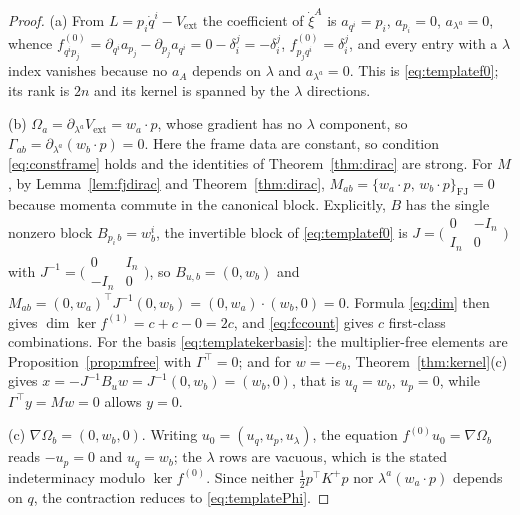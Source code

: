 \documentclass[12pt]{article}
\theoremstyle{plain}
\theoremstyle{definition}
\theoremstyle{remark}
\newcommand{\pd}[1]{\partial_{#1}}
\newcommand{\Om}{\Omega}
\newcommand{\FJ}{\mathrm{FJ}}
\begin{document}
	\begin{proof}
		(a) From $L=p_{i}\dot q^{i}-V_{\mathrm{ext}}$ the coefficient of $\dot\xi^{A}$
		is $a_{q^{i}}=p_{i}$, $a_{p_{i}}=0$, $a_{\lambda^{a}}=0$, whence
		$f^{(0)}_{q^{i}p_{j}}=\pd{q^{i}}a_{p_{j}}-\pd{p_{j}}a_{q^{i}}
		=0-\delta_{i}^{j}=-\delta_{i}^{j}$,
		$f^{(0)}_{p_{j}q^{i}}=\delta_{i}^{j}$, and every entry with a $\lambda$ index
		vanishes because no $a_{A}$ depends on $\lambda$ and $a_{\lambda^{a}}=0$.
		This is \eqref{eq:templatef0}; its rank is $2n$ and its kernel is spanned by
		the $\lambda$ directions.
		
		(b) $\Om_{a}=\partial_{\lambda^{a}}V_{\mathrm{ext}}=w_{a}\!\cdot\!p$, whose
		gradient has no $\lambda$ component, so $\Gamma_{ab}=\partial_{\lambda^{a}}
		(w_{b}\!\cdot\!p)=0$. Here the frame data are constant, so condition
		\eqref{eq:constframe} holds and the identities of Theorem~\ref{thm:dirac} are
		strong. For $M$, by Lemma~\ref{lem:fjdirac} and Theorem~\ref{thm:dirac},
		$M_{ab}=\{w_{a}\!\cdot\!p,\,w_{b}\!\cdot\!p\}_{\FJ}=0$ because momenta commute
		in the canonical block. Explicitly, $B$ has the single nonzero block
		$B_{p_{i}\,b}=w_{b}^{i}$, the invertible block of \eqref{eq:templatef0} is
		$J=\bigl(\begin{smallmatrix}0&-I_{n}\\ I_{n}&0\end{smallmatrix}\bigr)$ with
		$J^{-1}=\bigl(\begin{smallmatrix}0&I_{n}\\ -I_{n}&0\end{smallmatrix}\bigr)$,
		so $B_{u,b}=(0,w_{b})$ and
		$M_{ab}=(0,w_{a})^{\top}J^{-1}(0,w_{b})=(0,w_{a})\!\cdot\!(w_{b},0)=0$.
		Formula \eqref{eq:dim} then gives $\dim\ker f^{(1)}=c+c-0=2c$, and
		\eqref{eq:fccount} gives $c$ first-class combinations. For the basis
		\eqref{eq:templatekerbasis}: the multiplier-free elements are
		Proposition~\ref{prop:mfree} with $\Gamma^{\top}=0$; and for $w=-e_{b}$,
		Theorem~\ref{thm:kernel}(c) gives
		$x=-J^{-1}B_{u}w=J^{-1}(0,w_{b})=(w_{b},0)$, that is $u_{q}=w_{b}$,
		$u_{p}=0$, while $\Gamma^{\top}y=Mw=0$ allows $y=0$.
		
		(c) $\nabla\Om_{b}=(0,w_{b},0)$. Writing $u_{0}=(u_{q},u_{p},u_{\lambda})$, the
		equation $f^{(0)}u_{0}=\nabla\Om_{b}$ reads $-u_{p}=0$ and $u_{q}=w_{b}$;
		the $\lambda$ rows are vacuous, which is the stated indeterminacy modulo
		$\ker f^{(0)}$. Since neither $\tfrac12p^{\top}K^{+}p$ nor
		$\lambda^{a}(w_{a}\!\cdot\!p)$ depends on $q$, the contraction reduces to
		\eqref{eq:templatePhi}.
		

\end{proof}
\end{document}
